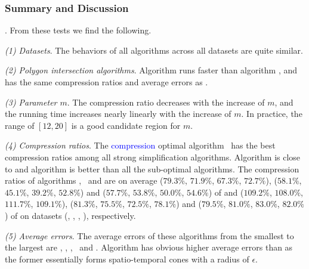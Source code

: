 {



\subsubsection{Summary and Discussion}
. From these tests we find the following.

\sstab \emph{(1) Datasets}. The behaviors of all algorithms across all datasets are quite similar.

\sstab \emph{(2) Polygon intersection algorithms}. Algorithm \rpia runs faster than  algorithm \cpia, and has the same compression ratios and average errors as \cpia.

\sstab\emph{(3) Parameter $m$}. The compression ratio decreases with the increase of $m$, and the running time increases nearly linearly with the increase of $m$. In practice, the range of $[12, 20]$ is a good candidate region for $m$.

\sstab\emph{(4) Compression ratios}. The \textcolor{blue}{compression} optimal \lsa algorithm \osed~has the best compression ratios among all strong simplification algorithms. Algorithm \cist is close to \dps and algorithm \cista is better than all the sub-optimal \lsa algorithms.
The compression ratios of algorithms \cist, \osed~and \cista are on average
($79.3\%$, $71.9\%$, $67.3\%$, $72.7\%$),
{($58.1\%$, $45.1\%$, $39.2\%$, $52.8\%$)} and ($57.7\%$, $53.8\%$, $50.0\%$, $54.6\%$) of \squishe
and ($109.2\%$, $108.0\%$, $111.7\%$, $109.1\%$), {($81.3\%$, $75.5\%$, $72.5\%$, $78.1\%$)} and ($79.5\%$, $81.0\%$, $83.0\%$, $82.0\%$) of \dps on {datasets} (\sercar, \geolife, \mopsi, \pricar), respectively.

\sstab\emph{(5) Average errors}. The average errors of these algorithms from the smallest to the largest are \squishe, \dps, \cist, \osed~and \cista. Algorithm \cista has obvious higher average errors than \cist as the former essentially forms spatio-temporal cones with a radius of $\epsilon$.

}
